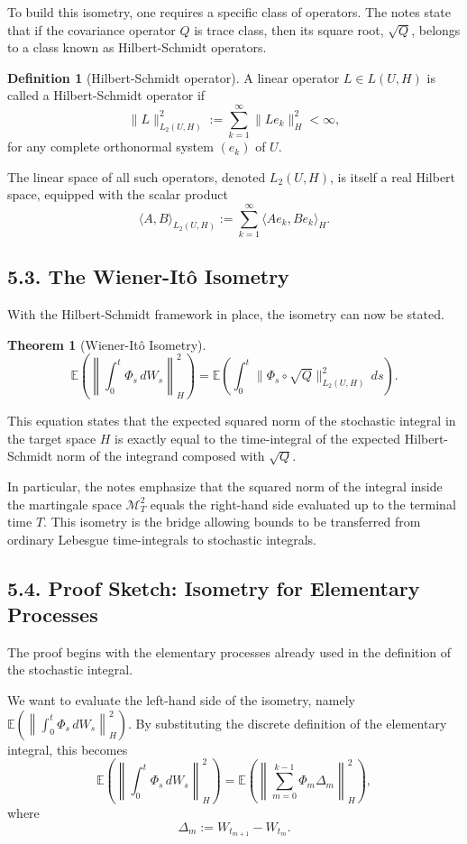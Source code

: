 \documentclass[11pt]{article}
\theoremstyle{definition}
\newtheorem{definition}{Definition}
\newtheorem{theorem}{Theorem}
\theoremstyle{remark}
\begin{document}
To build this isometry, one requires a specific class of operators. The notes state that if the covariance operator \(Q\) is trace class, then its square root, \(\sqrt{Q}\), belongs to a class known as Hilbert-Schmidt operators.

\begin{definition}[Hilbert-Schmidt operator]
A linear operator \(L\in L(U,H)\) is called a Hilbert-Schmidt operator if
\[
\|L\|_{L_2(U,H)}^2:=\sum_{k=1}^{\infty}\|Le_k\|_H^2<\infty,
\]
for any complete orthonormal system \((e_k)\) of \(U\).
\end{definition}

The linear space of all such operators, denoted \(L_2(U,H)\), is itself a real Hilbert space, equipped with the scalar product
\[
\langle A,B\rangle_{L_2(U,H)}:=\sum_{k=1}^{\infty}\langle Ae_k,Be_k\rangle_H.
\]

\subsection*{5.3. The Wiener-It\^o Isometry}
With the Hilbert-Schmidt framework in place, the isometry can now be stated.

\begin{theorem}[Wiener-It\^o Isometry]
\[
\mathbb E\left(\left\|\int_0^t \Phi_s\,dW_s\right\|_H^2\right)
=
\mathbb E\left(\int_0^t \|\Phi_s\circ \sqrt{Q}\|_{L_2(U,H)}^2\,ds\right).
\]
\end{theorem}

This equation states that the expected squared norm of the stochastic integral in the target space \(H\) is exactly equal to the time-integral of the expected Hilbert-Schmidt norm of the integrand composed with \(\sqrt{Q}\).

In particular, the notes emphasize that the squared norm of the integral inside the martingale space \(\mathcal M_T^2\) equals the right-hand side evaluated up to the terminal time \(T\). This isometry is the bridge allowing bounds to be transferred from ordinary Lebesgue time-integrals to stochastic integrals.

\subsection*{5.4. Proof Sketch: Isometry for Elementary Processes}
The proof begins with the elementary processes already used in the definition of the stochastic integral.

We want to evaluate the left-hand side of the isometry, namely \(\mathbb E\left(\left\|\int_0^t \Phi_s\,dW_s\right\|_H^2\right)\).
By substituting the discrete definition of the elementary integral, this becomes
\[
\mathbb E\left(\left\|\int_0^t \Phi_s\,dW_s\right\|_H^2\right)
=
\mathbb E\left(\left\|\sum_{m=0}^{k-1}\Phi_m\Delta_m\right\|_H^2\right),
\]
where
\[
\Delta_m:=W_{t_{m+1}}-W_{t_m}.
\]
\end{document}
